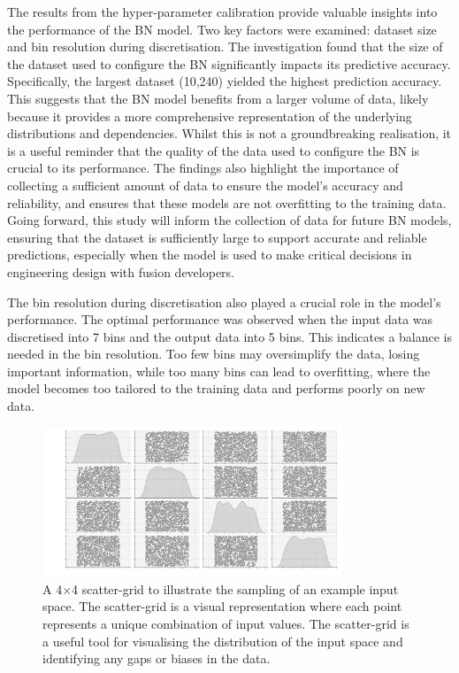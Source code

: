 \documentclass[journal]{IEEEtran}
\begin{document}
The results from the hyper-parameter calibration provide valuable insights into the performance of the BN model. Two key factors were examined: dataset size and bin resolution during discretisation. The investigation found that the size of the dataset used to configure the BN significantly impacts its predictive accuracy. Specifically, the largest dataset (10,240) yielded the highest prediction accuracy. This suggests that the BN model benefits from a larger volume of data, likely because it provides a more comprehensive representation of the underlying distributions and dependencies. Whilst this is not a groundbreaking realisation, it is a useful reminder that the quality of the data used to configure the BN is crucial to its performance. The findings also highlight the importance of collecting a sufficient amount of data to ensure the model's accuracy and reliability, and ensures that these models are not overfitting to the training data. Going forward, this study will inform the collection of data for future BN models, ensuring that the dataset is sufficiently large to support accurate and reliable predictions, especially when the model is used to make critical decisions in engineering design with fusion developers.

The bin resolution during discretisation also played a crucial role in the model's performance. The optimal performance was observed when the input data was discretised into 7 bins and the output data into 5 bins. This indicates a balance is needed in the bin resolution. Too few bins may oversimplify the data, losing important information, while too many bins can lead to overfitting, where the model becomes too tailored to the training data and performs poorly on new data.

\begin{figure}[t]
    \centering
    \includegraphics[width=0.8\textwidth]{figures/TE_results/4grid_scatter.png}
    \caption{\small A 4$\times$4 scatter-grid to illustrate the sampling of an example input space. The scatter-grid is a visual representation where each point represents a unique combination of input values. The scatter-grid is a useful tool for visualising the distribution of the input space and identifying any gaps or biases in the data.}\label{fig:scatter_sampling}
\end{figure}
\end{document}
